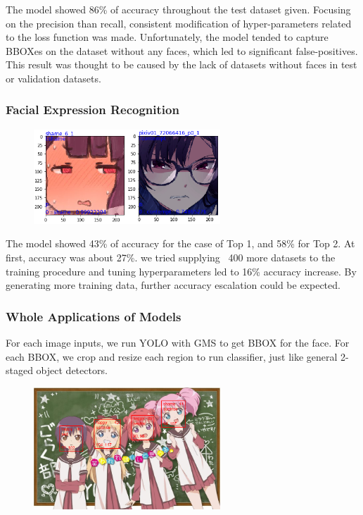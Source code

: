 \documentclass{article}
\begin{document}
The model showed 86\% of accuracy throughout the test dataset given. Focusing on
the precision than recall, consistent modification of hyper-parameters related
to the loss function was made. Unfortunately, the model tended to capture BBOXes
on the dataset without any faces, which led to significant false-positives. This
result was thought to be caused by the lack of datasets without faces in test or
validation datasets.

\subsubsection{Facial Expression Recognition}
\begin{figure}[h]
  \centering
  \includegraphics[width=7cm]{image/classifier_example.png}
\end{figure}

The model showed 43\% of accuracy for the case of Top 1, and 58\% for Top 2. At
first, accuracy was about 27\%. we tried supplying ~400 more datasets to the
training procedure and tuning hyperparameters led to 16\% accuracy increase. By
generating more training data, further accuracy escalation could be expected.

\subsubsection{Whole Applications of Models}
For each image inputs, we run YOLO with GMS to get BBOX for the face. For each
BBOX, we crop and resize each region to run classifier, just like general
2-staged object detectors.

\begin{figure}[h]
  \centering
  \includegraphics[width=7cm]{image/yolo_class_example.png}
\end{figure}
\end{document}
